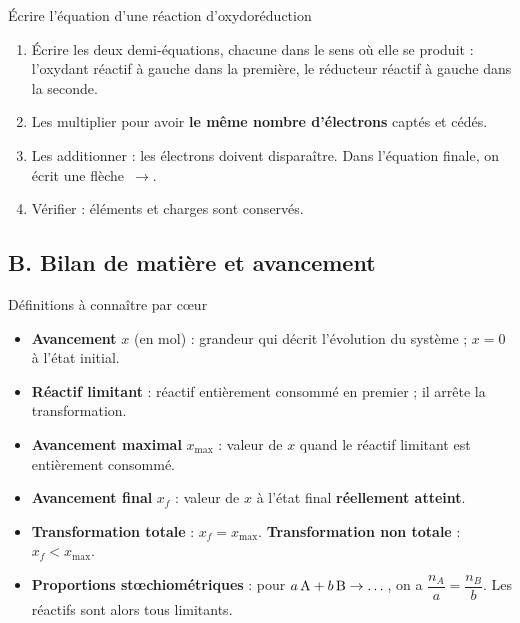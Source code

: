 \documentclass[11pt,a4paper]{article}
\begin{document}
\begin{methode}{Écrire l'équation d'une réaction d'oxydoréduction}
\begin{enumerate}
  \item Écrire les deux demi-équations, chacune dans le sens où elle se produit : l'oxydant réactif à gauche dans la première, le réducteur réactif à gauche dans la seconde.
  \item Les multiplier pour avoir \textbf{le même nombre d'électrons} captés et cédés.
  \item Les additionner : les électrons doivent disparaître. Dans l'équation finale, on écrit une flèche~$\to$.
  \item Vérifier : éléments et charges sont conservés.
\end{enumerate}
\end{methode}

\subsection*{B. Bilan de matière et avancement}

\begin{definition}{Définitions à connaître par cœur}
\begin{itemize}
  \item \textbf{Avancement} $x$ (en mol) : grandeur qui décrit l'évolution du système ; $x = 0$ à l'état initial.
  \item \textbf{Réactif limitant} : réactif entièrement consommé en premier ; il arrête la transformation.
  \item \textbf{Avancement maximal} $x_{\max}$ : valeur de $x$ quand le réactif limitant est entièrement consommé.
  \item \textbf{Avancement final} $x_f$ : valeur de $x$ à l'état final \textbf{réellement atteint}.
  \item \textbf{Transformation totale} : $x_f = x_{\max}$. \textbf{Transformation non totale} : $x_f < x_{\max}$.
  \item \textbf{Proportions stœchiométriques} : pour $a\,\ce{A} + b\,\ce{B} \to \dots$, on a $\dfrac{n_A}{a} = \dfrac{n_B}{b}$. Les réactifs sont alors tous limitants.
\end{itemize}
\end{definition}
\end{document}
